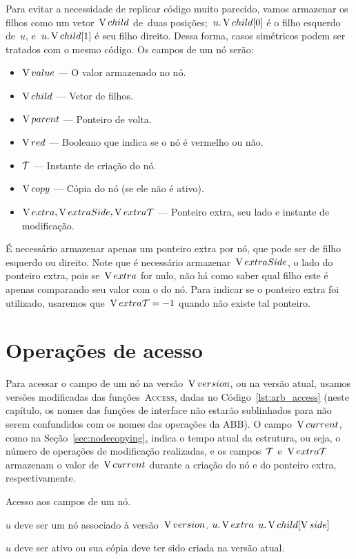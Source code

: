 \documentclass[main.tex]{subfiles}
\begin{document}
Para evitar a necessidade de replicar código muito parecido, vamos armazenar os filhos como um vetor~$\operatorname{V}{child}$ de~duas posições;~$u.\operatorname{V}{child}[0]$ é o filho esquerdo de~$u$, e~$u.\operatorname{V}{child}[1]$ é seu filho direito. Dessa forma, casos simétricos podem ser tratados com o mesmo código. Os campos de um nó serão:
\begin{itemize}
\item $\operatorname{V}{value}$ --- O valor armazenado no nó.
\item $\operatorname{V}{child}$ --- Vetor de filhos.
\item $\operatorname{V}{parent}$ --- Ponteiro de volta.
\item $\operatorname{V}{red}$ --- Booleano que indica se o nó é vermelho ou não.
\item $\mathcal{T}$ --- Instante de criação do nó.
\item $\operatorname{V}{copy}$ --- Cópia do nó (se ele não é ativo).
\item $\operatorname{V}{extra}, \operatorname{V}{extraSide}, \operatorname{V}{extra\mathcal{T}}$ --- Ponteiro extra, seu lado e instante de modificação.
\end{itemize}

É necessário armazenar apenas um ponteiro extra por nó, que pode ser de filho esquerdo ou direito. Note que é necessário armazenar~$\operatorname{V}{extraSide}$, o lado do ponteiro extra, pois se~$\operatorname{V}{extra}$ for nulo, não há como saber qual filho este é apenas comparando seu valor com o do nó. Para indicar se o ponteiro extra foi utilizado, usaremos que~$\operatorname{V}{extra\mathcal{T}} = -1$ quando não existe tal ponteiro.

\section{Operações de acesso} \label{sec:rbacesso}

Para acessar o campo de um nó na versão~$\operatorname{V}{version}$, ou na versão atual, usamos versões modificadas das funções~\textsc{Access}, dadas no Código~\ref{lst:arb_access} (neste capítulo, os nomes das funções de interface não estarão sublinhados para não serem confundidos com os nomes das operações da ABB). O campo~$\operatorname{V}{current}$, como na Seção~\ref{sec:nodecopying}, indica o tempo atual da estrutura, ou seja, o número de operações de modificação realizadas, e os campos~$\mathcal{T}$ e~$\operatorname{V}{extra\mathcal{T}}$ armazenam o valor de~$\operatorname{V}{current}$ durante a criação do nó e do ponteiro extra, respectivamente.

\begin{algorithm}
	\caption{Acesso aos campos de um nó.} \label{lst:arb_access}
\begin{algorithmic}[1]

\Require $u$ deve ser um nó associado à versão~$\operatorname{V}{version}$.
		\State \Return $u.\operatorname{V}{extra}$
	\EndIf
	\State \Return $u.\operatorname{V}{child}[\operatorname{V}{side}]$
\EndFunction

\Require $u$ deve ser ativo ou sua cópia deve ter sido criada na versão atual.
\State \Return {} 
\EndFunction

\end{algorithmic}
\end{algorithm}
\end{document}
